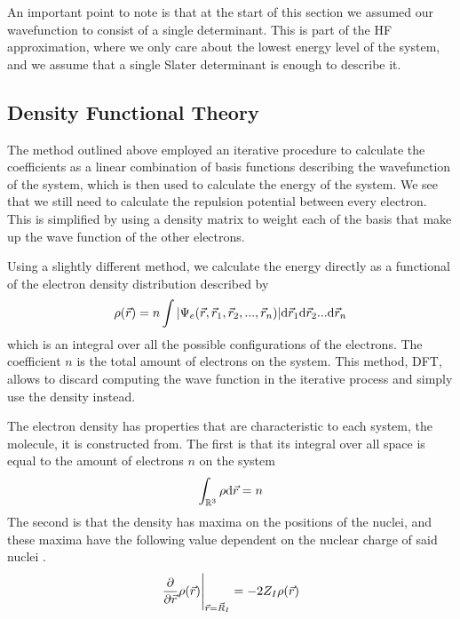 \documentclass[../master_thesis.tex]{subfiles}
\begin{document}
An important point to note is that at the start of this section we assumed our
wavefunction to consist of a single determinant. This is part of the \ac{HF}
approximation, where we only care about the lowest energy level of the system, and
we assume that a single Slater determinant is enough to describe it.

\subsection{Density Functional Theory}
The method outlined above employed an iterative procedure to calculate the coefficients
as a linear combination of basis functions describing the wavefunction of the
system, which is then used to calculate the energy of the system. We see that we
still need to calculate the repulsion potential between every electron. This is
simplified by using a density matrix to weight each of the basis that make up the
wave function of the other electrons.

Using a slightly different method, we calculate the energy directly as a functional
of the electron density distribution \cite{Sorland, Cramer:2004} described by
\begin{equation}\label{eq:densityintegral}
  \rho(\vec{r}) = n \int\abs{\Psi_e(\vec{r}, \vec{r}_1, \vec{r}_2,..., \vec{r}_n)} \text{d}\vec{r}_1\text{d}\vec{r}_2...\text{d}\vec{r}_n
\end{equation}
which is an integral over all the possible configurations of the electrons. The
coefficient $n$ is the total amount of electrons on the system. This method,
\ac{DFT}, allows to discard computing the wave function in the iterative process and
simply use the density instead.

The electron density has properties that are characteristic to each system, the
molecule,  it is constructed from. The first is that its integral over all space
is equal to the amount of electrons $n$ on the system \cite{Cramer:2004}
\begin{equation}
  \int_{\mathbb{R}^3}\rho \text{d}\vec{r} = n
\end{equation}
The second is that the density has maxima on the positions of the nuclei, and
these maxima have the following value dependent on the nuclear charge of said
nuclei \cite{Cramer:2004}.
\begin{equation}
 \frac{\partial}{\partial \vec{r}}\rho(\vec{r})\Bigg|_{\vec{r} = \vec{R}_I} = -2Z_I\rho(\vec{r})
\end{equation}
\end{document}
